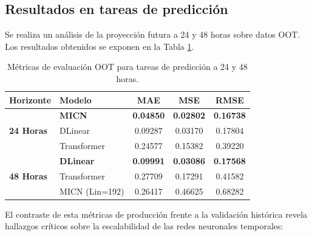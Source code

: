 \subsection{Resultados en tareas de predicción}

Se realiza un análisis de la proyección futura a 24 y 48 horas sobre datos OOT. Los resultados obtenidos se exponen en la Tabla \ref{tab:resultados_oot_forecasting}.

\begin{table}[H]
	\centering
	\caption{Métricas de evaluación OOT para tareas de predicción a 24 y 48 horas.}
	\label{tab:resultados_oot_forecasting}
	\begin{tabular}{llccc}
		\toprule
		\textbf{Horizonte} & \textbf{Modelo} & \textbf{MAE} & \textbf{MSE} & \textbf{RMSE} \\
		\midrule
		\multirow{3}{*}{\textbf{24 Horas}} & \textbf{MICN} & \textbf{0.04850} & \textbf{0.02802} & \textbf{0.16738} \\
		& DLinear & 0.09287 & 0.03170 & 0.17804 \\
		& Transformer & 0.24577 & 0.15382 & 0.39220 \\
		\midrule
		\multirow{3}{*}{\textbf{48 Horas}} & \textbf{DLinear} & \textbf{0.09991} & \textbf{0.03086} & \textbf{0.17568} \\
		& Transformer & 0.27709 & 0.17291 & 0.41582 \\
		& MICN (L{in}=192) & 0.26417 & 0.46625 & 0.68282 \\
		\bottomrule
	\end{tabular}
\end{table}

El contraste de esta métricas de producción frente a la validación histórica revela hallazgos críticos sobre la escalabilidad de las redes neuronales temporales:

